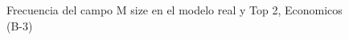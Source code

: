 \begin{figure}[H]
    \centering
    
    \caption{Frecuencia del campo M size en el modelo real y Top 2, Economicos (B-3)}
    \label{frecuency-M Size-top2}
\end{figure}